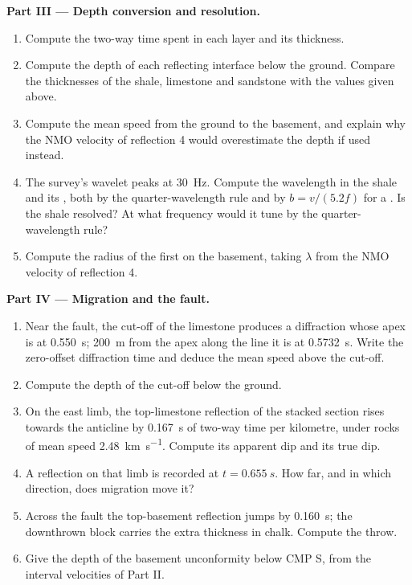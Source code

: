 \begin{problem}
\noindent\textbf{Part III --- Depth conversion and resolution.}
\begin{enumerate}[resume]
  \item Compute the two-way time spent in each layer and its thickness.
  \item Compute the depth of each reflecting interface below the ground. Compare
        the thicknesses of the shale, limestone and sandstone with the values
        given above.
  \item Compute the mean speed from the ground to the basement, and explain why
        the NMO velocity of reflection 4 would overestimate the depth if used
        instead.
  \item The survey's wavelet peaks at \qty{30}{Hz}. Compute the wavelength in
        the shale and its , both by the quarter-wavelength rule
        and by $b = v/(5.2f)$ for a . Is the shale resolved? At
        what frequency would it tune by the quarter-wavelength rule?
  \item Compute the radius of the first  on the basement, taking
        $\lambda$ from the NMO velocity of reflection 4.
\end{enumerate}

\noindent\textbf{Part IV --- Migration and the fault.}
\begin{enumerate}[resume]
  \item Near the fault, the cut-off of the limestone produces a diffraction
        whose apex is at \qty{0.550}{s}; \qty{200}{m} from the apex along the line
        it is at \qty{0.5732}{s}. Write the zero-offset diffraction time and
        deduce the mean speed above the cut-off.
  \item Compute the depth of the cut-off below the ground.
  \item On the east limb, the top-limestone reflection of the stacked section
        rises towards the anticline by \qty{0.167}{s} of two-way time per
        kilometre, under rocks of mean speed \qty{2.48}{km.s^{-1}}. Compute its
        apparent dip and its true dip.
  \item A reflection on that limb is recorded at $t = \qty{0.655}{s}$. How far,
        and in which direction, does migration move it?
  \item Across the fault the top-basement reflection jumps by \qty{0.160}{s};
        the downthrown block carries the extra thickness in chalk. Compute the
        throw.
  \item Give the depth of the basement unconformity below CMP S, from the
        interval velocities of Part II.
\end{enumerate}
\end{problem}
